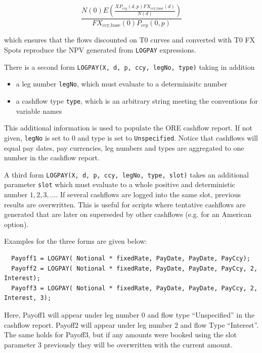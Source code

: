 \begin{equation}
  \frac{ N(0) E\left(\frac{X P_{ccy}(d,p) FX_{\text{ccy},\text{base}}(d)}{N(d)}\right) }{ FX_{\text{ccy},\text{base}}(0) P_{ccy}(0,p) }
\end{equation}

which ensures that the flows discounted on T0 curves and converted with T0 FX Spots reproduce the NPV generated from
\verb+LOGPAY+ expressions.

There is a second form {\tt LOGPAY(X, d, p, ccy, legNo, type)} taking in addition

\begin{itemize}
\item a leg number \verb+legNo+, which must evaluate to a determinisitc number
\item a cashflow type \verb+type+, which is an arbitrary string meeting the conventions for variable names
\end{itemize}

This additional information is used to populate the ORE cashflow report. If not given, \verb+legNo+ is set to $0$ and
type is set to \verb+Unspecified+. Notice that cashflows will equal pay dates, pay currencies, leg numbers and types are
aggregated to one number in the cashflow report.

A third form {\tt LOGPAY(X, d, p, ccy, legNo, type, slot)} takes an additional parameter \verb+slot+ which must evaluate
to a whole positive and deterministic number $1,2,3,\ldots$. If several cashflows are logged into the same slot,
previous results are overwritten. This is useful for scripts where tentative cashflows are generated that are later on
superseded by other cashflows (e.g. for an American option).

Examples for the three forms are given below:

\begin{verbatim}
  Payoff1 = LOGPAY( Notional * fixedRate, PayDate, PayDate, PayCcy);
  Payoff2 = LOGPAY( Notional * fixedRate, PayDate, PayDate, PayCcy, 2, Interest);
  Payoff3 = LOGPAY( Notional * fixedRate, PayDate, PayDate, PayCcy, 2, Interest, 3);
\end{verbatim}

Here, Payoff1 will appear under leg number $0$ and flow type ``Unspecified'' in the cashflow report. Payoff2 will appear
under leg number $2$ and flow Type ``Interest''. The same holds for Payoff3, but if any amounts were booked using the
slot parameter $3$ previously they will be overwritten with the current amount.

